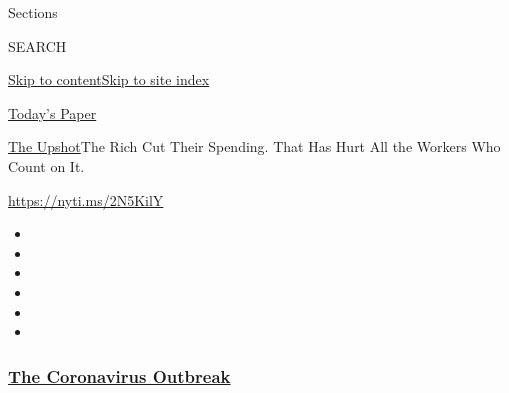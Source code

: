 Sections

SEARCH

\protect\hyperlink{site-content}{Skip to
content}\protect\hyperlink{site-index}{Skip to site index}

\href{https://myaccount.nytimes3xbfgragh.onion/auth/login?response_type=cookie\&client_id=vi}{}

\href{https://www.nytimes3xbfgragh.onion/section/todayspaper}{Today's
Paper}

\href{/section/upshot}{The Upshot}\textbar{}The Rich Cut Their Spending.
That Has Hurt All the Workers Who Count on It.

\url{https://nyti.ms/2N5KilY}

\begin{itemize}
\item
\item
\item
\item
\item
\item
\end{itemize}

\hypertarget{the-coronavirus-outbreak}{%
\subsubsection{\texorpdfstring{\href{https://www.nytimes3xbfgragh.onion/news-event/coronavirus?name=styln-coronavirus-national\&region=TOP_BANNER\&variant=undefined\&block=storyline_menu_recirc\&action=click\&pgtype=Article\&impression_id=a6546ea0-e3ad-11ea-85cc-bf105b368d22}{The
Coronavirus
Outbreak}}{The Coronavirus Outbreak}}\label{the-coronavirus-outbreak}}

